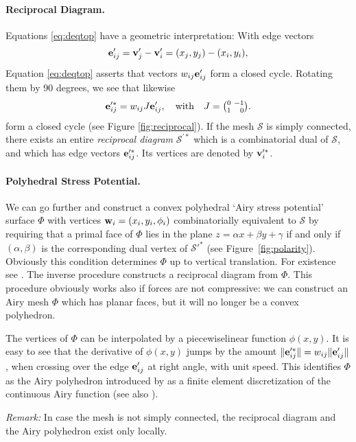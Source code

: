 \documentclass[annual]{acmsiggraph}
\def\SS{{\mathcal S}}
\begin{document}
\paragraph{Reciprocal Diagram.}

Equations \eqref{eq:deqtop} have a geometric interpretation: With edge
vectors
	$${\mathbf e}'_{ij} = {\mathbf v}_j'-{\mathbf v}_i'=(x_j, y_j) - (x_i, y_i),
	$$
 Equation \eqref{eq:deqtop} asserts that vectors $w_{ij} {\mathbf e}_{ij}'$ form a
closed cycle. Rotating them by 90 degrees, we see that likewise
	$$
	{\mathbf e}_{ij}^{\prime *} = w_{ij} J {\mathbf e}_{ij}', \quad \text{with}\quad
	J={\textstyle{0 \ -1 \choose 1 \ \hphantom{-}0}}.
	$$
 form a closed cycle (see Figure \ref{fig:reciprocal}).
If the mesh $\SS$ is simply connected, there exists
an entire {\em reciprocal diagram} $\SS^{\prime *}$ which is a
combinatorial dual of $\SS$, and which has edge vectors ${\mathbf e}_{ij}'^*$.
 Its vertices are denoted by ${\mathbf v}_i^{\prime *}$. 

\paragraph{Polyhedral Stress Potential.}

We can go further and construct a convex polyhedral `Airy stress potential'
surface $\Phi$ with
vertices ${\mathbf w}_i=(x_i,y_i,\phi_i)$ combinatorially equivalent to $\SS$ by
requiring that a primal face of $\Phi$ lies in the plane $z=\alpha x +
\beta y + \gamma$ if and only if $(\alpha,\beta)$ is the corresponding
dual vertex of $\SS'^*$ (see Figure~\ref{fig:polarity}). Obviously this
condition determines $\Phi$ up to vertical translation. For existence see
\cite{Ash1988}. The inverse procedure constructs a reciprocal diagram from
$\Phi$. This procedure obviously works also if forces are not compressive:
we can construct an Airy mesh $\Phi$ which has planar faces, but it will
no longer be a convex polyhedron.

The vertices of $\Phi$ can be interpolated by a piecewise\dash linear
function $\phi(x,y)$. It is easy to see that the derivative of $\phi(x,y)$
jumps by the amount $\|{\mathbf e}_{ij}'^*\| = w_{ij}\|{\mathbf e}_{ij}'\|$, when crossing
over the edge ${\mathbf e}'_{ij}$ at right angle, with unit speed. This identifies
$\Phi$ as the Airy polyhedron introduced by \cite{Fraternali2002a} as a
finite element discretization of the continuous Airy function (see also
\cite{Fraternali2010}).

{\it Remark:} In case the mesh is not simply connected, the reciprocal
diagram and the Airy polyhedron exist only locally.
\end{document}
